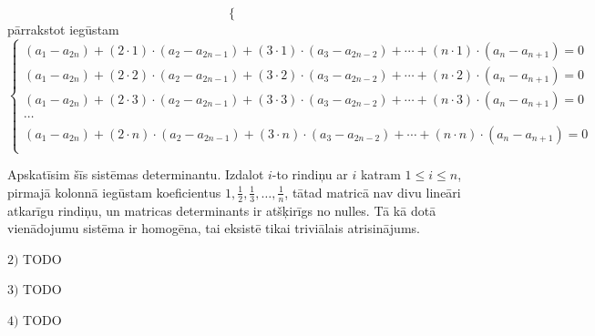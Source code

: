 \documentclass{ludis}
\begin{document}
\begin{pieradijums}
\[\begin{cases}
	\end{cases}
\]
pārrakstot iegūstam
\[
	\begin{cases}
		(a_1 - a_{2n}) + (2\cdot 1) \cdot (a_2 - a_{2n-1}) + (3 \cdot 1)\cdot (a_3 - a_{2n-2}) + \cdots + (n \cdot 1) \cdot (a_n - a_{n+1}) = 0\\
		(a_1 - a_{2n}) + (2\cdot 2) \cdot (a_2 - a_{2n-1}) + (3 \cdot 2)\cdot (a_3 - a_{2n-2}) + \cdots + (n \cdot 2) \cdot (a_n - a_{n+1}) = 0\\
		(a_1 - a_{2n}) + (2\cdot 3) \cdot (a_2 - a_{2n-1}) + (3 \cdot 3)\cdot (a_3 - a_{2n-2}) + \cdots + (n \cdot 3) \cdot (a_n - a_{n+1}) = 0\\
		\cdots \\
		(a_1 - a_{2n}) + (2\cdot n) \cdot (a_2 - a_{2n-1}) + (3 \cdot n)\cdot (a_3 - a_{2n-2}) + \cdots + (n \cdot n) \cdot (a_n - a_{n+1}) = 0\\
	\end{cases}
\]

Apskatīsim šīs sistēmas determinantu. Izdalot $i$-to rindiņu ar $i$ katram $1 \leq i \leq n$, pirmajā kolonnā iegūstam koeficientus
$1, \frac{1}{2}, \frac{1}{3}, \ldots, \frac{1}{n}$,
tātad matricā nav divu lineāri atkarīgu rindiņu, un matricas determinants ir atšķirīgs no nulles. Tā kā dotā vienādojumu sistēma ir homogēna, tai eksistē tikai triviālais atrisinājums.

$2)$ TODO

$3)$ TODO

$4)$ TODO
\end{pieradijums}

\printbibliography
\end{document}
